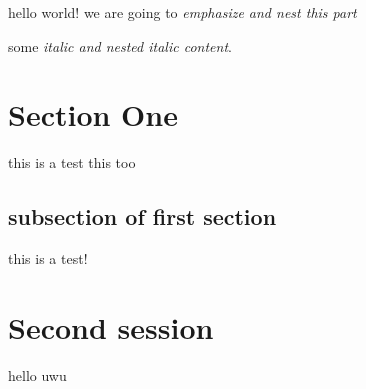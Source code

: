 \documentclass{article}
\begin{document}
hello world! we are going to \emph{emphasize and \emph{nest} this part}

some \textit{italic and \textit{nested} italic content}.

\section{Section One}
this is a test
this too

\subsection{subsection of first section}
this is a test!

\section{Second session}
hello uwu
\end{document}
